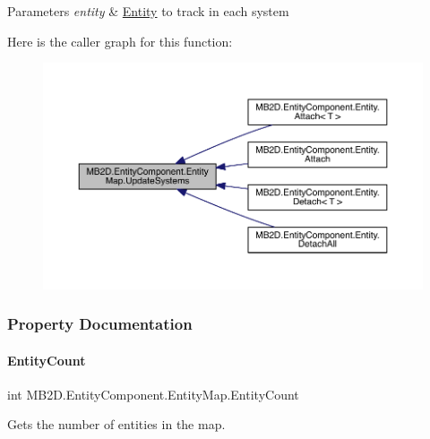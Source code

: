 \begin{DoxyParams}{Parameters}
{\em entity} & \hyperlink{class_m_b2_d_1_1_entity_component_1_1_entity}{Entity} to track in each system\\
\hline
\end{DoxyParams}
Here is the caller graph for this function\+:
\nopagebreak
\begin{figure}[H]
\begin{center}
\leavevmode
\includegraphics[width=350pt]{class_m_b2_d_1_1_entity_component_1_1_entity_map_ab6078e0b6eddb220b9bbf5d358d6e365_icgraph}
\end{center}
\end{figure}


\subsubsection{Property Documentation}
\hypertarget{class_m_b2_d_1_1_entity_component_1_1_entity_map_a607d25be9724ca759ecef96fe76ee516}{}\label{class_m_b2_d_1_1_entity_component_1_1_entity_map_a607d25be9724ca759ecef96fe76ee516} 
\paragraph{\texorpdfstring{Entity\+Count}{EntityCount}}
{\footnotesize\ttfamily int M\+B2\+D.\+Entity\+Component.\+Entity\+Map.\+Entity\+Count\hspace{0.3cm}{\ttfamily [get]}}



Gets the number of entities in the map. 

